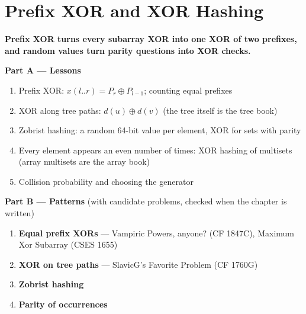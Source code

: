 \chapter{Prefix XOR and XOR Hashing}
\label{ch:prefix_xor}

\begin{tcolorbox}[enhanced, colback=white, colframe=secondaryblue, boxrule=1pt, arc=2mm]
\textbf{\large\textcolor{primaryblue}{Prefix XOR turns every subarray XOR into one XOR of two prefixes, and random values turn parity questions into XOR checks.}}
\end{tcolorbox}


\begin{plannedbox}
\textbf{Part A --- Lessons}
\begin{enumerate}[leftmargin=*, label=\textbf{A\arabic*.}, itemsep=1pt]
    \item Prefix XOR: $x(l..r) = P_r \oplus P_{l-1}$; counting equal prefixes
    \item XOR along tree paths: $d(u) \oplus d(v)$ (the tree itself is the tree book)
    \item Zobrist hashing: a random 64-bit value per element, XOR for sets with parity
    \item Every element appears an even number of times: XOR hashing of multisets (array multisets are the array book)
    \item Collision probability and choosing the generator
\end{enumerate}
\textbf{Part B --- Patterns} (with candidate problems, checked when the chapter is written)
\begin{enumerate}[leftmargin=*, label=\textbf{P\arabic*.}, itemsep=1pt]
    \item \textbf{Equal prefix XORs} --- Vampiric Powers, anyone? {\small\color{darkgray}(CF 1847C)}, Maximum Xor Subarray {\small\color{darkgray}(CSES 1655)}
    \item \textbf{XOR on tree paths} --- SlavicG's Favorite Problem {\small\color{darkgray}(CF 1760G)}
    \item \textbf{Zobrist hashing}
    \item \textbf{Parity of occurrences}
\end{enumerate}
\end{plannedbox}
